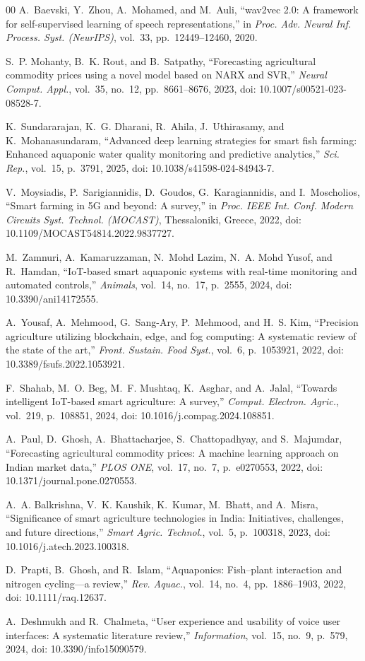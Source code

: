 \documentclass[conference]{IEEEtran}
\begin{document}
\begin{thebibliography}{00}
A.~Baevski, Y.~Zhou, A.~Mohamed, and M.~Auli,
``wav2vec 2.0: A framework for self-supervised learning of speech
representations,''
in \textit{Proc. Adv. Neural Inf. Process. Syst. (NeurIPS)},
vol.~33, pp.~12449--12460, 2020.

S.~P. Mohanty, B.~K. Rout, and B.~Satpathy,
``Forecasting agricultural commodity prices using a novel model based
on NARX and SVR,''
\textit{Neural Comput. Appl.},
vol.~35, no.~12, pp.~8661--8676, 2023,
doi: 10.1007/s00521-023-08528-7.

K.~Sundararajan, K.~G. Dharani, R.~Ahila, J.~Uthirasamy,
and K.~Mohanasundaram,
``Advanced deep learning strategies for smart fish farming: Enhanced
aquaponic water quality monitoring and predictive analytics,''
\textit{Sci. Rep.},
vol.~15, p.~3791, 2025,
doi: 10.1038/s41598-024-84943-7.

V.~Moysiadis, P.~Sarigiannidis, D.~Goudos, G.~Karagiannidis,
and I.~Moscholios,
``Smart farming in 5G and beyond: A survey,''
in \textit{Proc. IEEE Int. Conf. Modern Circuits Syst. Technol.
(MOCAST)}, Thessaloniki, Greece, 2022,
doi: 10.1109/MOCAST54814.2022.9837727.

M.~Zamnuri, A.~Kamaruzzaman, N.~Mohd Lazim, N.~A. Mohd Yusof,
and R.~Hamdan,
``IoT-based smart aquaponic systems with real-time monitoring and
automated controls,''
\textit{Animals},
vol.~14, no.~17, p.~2555, 2024,
doi: 10.3390/ani14172555.

A.~Yousaf, A.~Mehmood, G.~Sang-Ary, P.~Mehmood,
and H.~S. Kim,
``Precision agriculture utilizing blockchain, edge, and fog
computing: A systematic review of the state of the art,''
\textit{Front. Sustain. Food Syst.},
vol.~6, p.~1053921, 2022,
doi: 10.3389/fsufs.2022.1053921.

F.~Shahab, M.~O. Beg, M.~F. Mushtaq, K.~Asghar,
and A.~Jalal,
``Towards intelligent IoT-based smart agriculture: A survey,''
\textit{Comput. Electron. Agric.},
vol.~219, p.~108851, 2024,
doi: 10.1016/j.compag.2024.108851.

A.~Paul, D.~Ghosh, A.~Bhattacharjee, S.~Chattopadhyay,
and S.~Majumdar,
``Forecasting agricultural commodity prices: A machine learning
approach on Indian market data,''
\textit{PLOS ONE},
vol.~17, no.~7, p.~e0270553, 2022,
doi: 10.1371/journal.pone.0270553.

A.~A. Balkrishna, V.~K. Kaushik, K.~Kumar, M.~Bhatt,
and A.~Misra,
``Significance of smart agriculture technologies in India:
Initiatives, challenges, and future directions,''
\textit{Smart Agric. Technol.},
vol.~5, p.~100318, 2023,
doi: 10.1016/j.atech.2023.100318.

D.~Prapti, B.~Ghosh, and R.~Islam,
``Aquaponics: Fish--plant interaction and nitrogen cycling---a review,''
\textit{Rev. Aquac.},
vol.~14, no.~4, pp.~1886--1903, 2022,
doi: 10.1111/raq.12637.

A.~Deshmukh and R.~Chalmeta,
``User experience and usability of voice user interfaces:
A systematic literature review,''
\textit{Information},
vol.~15, no.~9, p.~579, 2024,
doi: 10.3390/info15090579.

\end{thebibliography}
\end{document}
